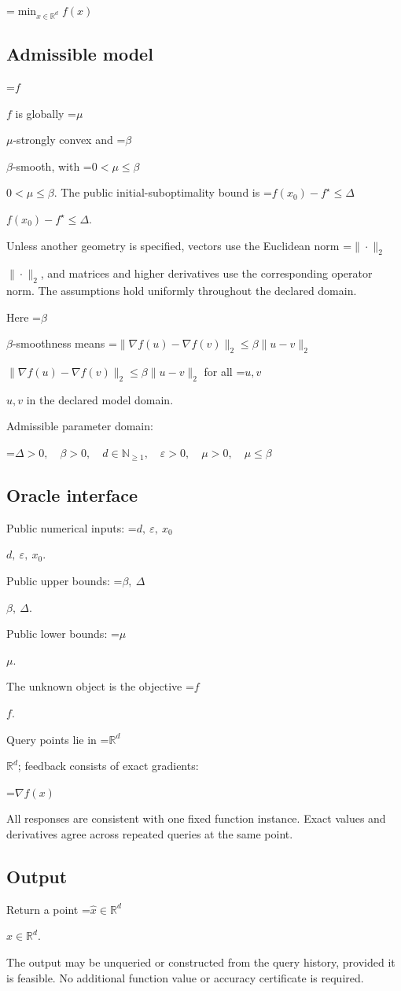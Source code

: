 \documentclass[10pt,a4paper]{article}
\newcommand{\AtlasMath}[1]{\par\begingroup\centering\setbox0=\hbox{$\displaystyle #1$}\ifdim\wd0>1.4\linewidth\typeout{ATLAS WIDE FORMULA: \the\wd0}\fi\ifdim\wd0>\linewidth\resizebox{\linewidth}{!}{\box0}\else\box0\fi\par\endgroup}
\newcommand{\AtlasInlineMath}[1]{\begingroup\setbox0=\hbox{$#1$}\ifdim\wd0>.4\linewidth\endgroup\AtlasMath{#1}\else\endgroup$#1$\fi}
\begin{document}
\AtlasMath{\min_{x\in \mathbb{R}^d}f(x)}


\subsection{Admissible model}
\AtlasInlineMath{f} is globally \AtlasInlineMath{\mu}-strongly convex and \AtlasInlineMath{\beta}-smooth, with \AtlasInlineMath{0<\mu\le\beta}. The public initial-suboptimality bound is \AtlasInlineMath{f(x_0)-f^\star\le\Delta}.

Unless another geometry is specified, vectors use the Euclidean norm \AtlasInlineMath{\|\cdot\|_2}, and matrices and higher derivatives use the corresponding operator norm. The assumptions hold uniformly throughout the declared domain.

Here \AtlasInlineMath{\beta}-smoothness means \AtlasInlineMath{\|\nabla f(u)-\nabla f(v)\|_2\le\beta\|u-v\|_2} for all \AtlasInlineMath{u,v} in the declared model domain.

Admissible parameter domain:


\AtlasMath{\Delta>0,\quad \beta>0,\quad d\in\mathbb{N}_{\ge1},\quad \varepsilon>0,\quad \mu>0,\quad \mu\le\beta}


\subsection{Oracle interface}
Public numerical inputs: \AtlasInlineMath{d,\ \varepsilon,\ x_0}.

Public upper bounds: \AtlasInlineMath{\beta,\ \Delta}.

Public lower bounds: \AtlasInlineMath{\mu}.

The unknown object is the objective \AtlasInlineMath{f}.

Query points lie in \AtlasInlineMath{\mathbb{R}^d}; feedback consists of exact gradients:


\AtlasMath{\nabla f(x)}


All responses are consistent with one fixed function instance. Exact values and derivatives agree across repeated queries at the same point.

\subsection{Output}
Return a point \AtlasInlineMath{\widehat x\in\mathbb R^d}.

The output may be unqueried or constructed from the query history, provided it is feasible. No additional function value or accuracy certificate is required.
\end{document}
